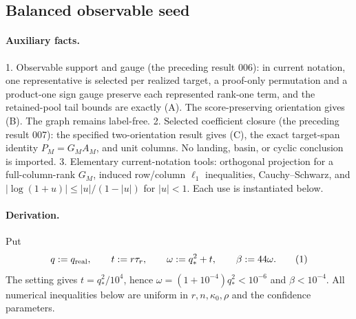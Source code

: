 \subsection{Balanced observable seed}\label{app:step-008}

\paragraph{Auxiliary facts.}

1. Observable support and gauge (the preceding result 006): in current notation,
   one representative is selected per realized target, a proof-only
   permutation and a product-one sign gauge preserve each represented
   rank-one term, and the retained-pool tail bounds are exactly (A). The
   score-preserving orientation gives (B). The graph remains label-free.
2. Selected coefficient closure (the preceding result 007): the specified two-orientation result gives (C), the exact target-span identity
   $P_M=G_MA_M$, and unit columns. No landing, basin, or cyclic conclusion is
   imported.
3. Elementary current-notation tools: orthogonal projection for a
   full-column-rank $G_M$, induced row/column $\ell_1$ inequalities,
   Cauchy--Schwarz, and
   $|\log(1+u)|\le |u|/(1-|u|)$ for $|u|<1$. Each use is instantiated below.

\paragraph{Derivation.}

Put
\[
 q:=q_{\rm real},\qquad t:=r\tau_r,\qquad
 \omega:=q_*^2+t,\qquad \beta:=44\omega. \tag{1}
\]
The setting gives $t=q_*^2/10^4$, hence
$\omega=(1+10^{-4})q_*^2<10^{-6}$ and $\beta<10^{-4}$. All numerical
inequalities below are uniform in $r,n,\kappa_0,\rho$ and the confidence
parameters.



